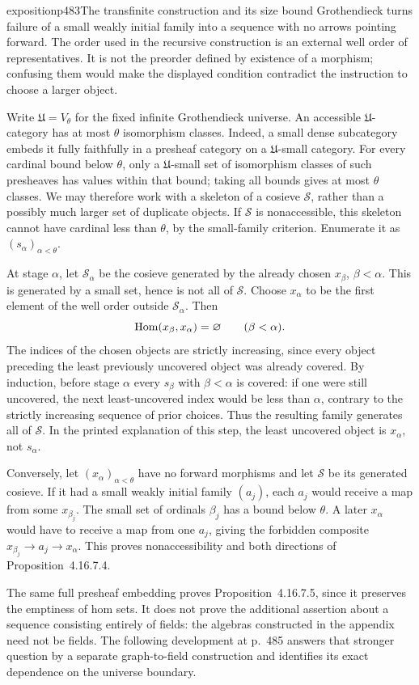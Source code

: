\begin{dcomment}{exposition}{p483}{The transfinite construction and its size bound}
Grothendieck turns failure of a small weakly initial family into a sequence with no arrows pointing forward. The order used in the recursive construction is an external well order of representatives. It is not the preorder defined by existence of a morphism; confusing them would make the displayed condition contradict the instruction to choose a larger object.

Write $\mathfrak U=V_\theta$ for the fixed infinite Grothendieck universe. An accessible $\mathfrak U$-category has at most $\theta$ isomorphism classes. Indeed, a small dense subcategory embeds it fully faithfully in a presheaf category on a $\mathfrak U$-small category. For every cardinal bound below $\theta$, only a $\mathfrak U$-small set of isomorphism classes of such presheaves has values within that bound; taking all bounds gives at most $\theta$ classes. We may therefore work with a skeleton of a cosieve $\mathcal S$, rather than a possibly much larger set of duplicate objects. If $\mathcal S$ is nonaccessible, this skeleton cannot have cardinal less than $\theta$, by the small-family criterion. Enumerate it as $(s_\alpha)_{\alpha<\theta}$.

At stage $\alpha$, let $\mathcal S_\alpha$ be the cosieve generated by the already chosen $x_\beta$, $\beta<\alpha$. This is generated by a small set, hence is not all of $\mathcal S$. Choose $x_\alpha$ to be the first element of the well order outside $\mathcal S_\alpha$. Then
\[
 \operatorname{Hom}(x_\beta,x_\alpha)=\varnothing\qquad(\beta<\alpha).
\]
The indices of the chosen objects are strictly increasing, since every object preceding the least previously uncovered object was already covered. By induction, before stage $\alpha$ every $s_\beta$ with $\beta<\alpha$ is covered: if one were still uncovered, the next least-uncovered index would be less than $\alpha$, contrary to the strictly increasing sequence of prior choices. Thus the resulting family generates all of $\mathcal S$. In the printed explanation of this step, the least uncovered object is $x_\alpha$, not $s_\alpha$.

Conversely, let $(x_\alpha)_{\alpha<\theta}$ have no forward morphisms and let $\mathcal S$ be its generated cosieve. If it had a small weakly initial family $(a_j)$, each $a_j$ would receive a map from some $x_{\beta_j}$. The small set of ordinals $\beta_j$ has a bound below $\theta$. A later $x_\alpha$ would have to receive a map from one $a_j$, giving the forbidden composite $x_{\beta_j}\to a_j\to x_\alpha$. This proves nonaccessibility and both directions of Proposition~4.16.7.4.

The same full presheaf embedding proves Proposition~4.16.7.5, since it preserves the emptiness of hom sets. It does not prove the additional assertion about a sequence consisting entirely of fields: the algebras constructed in the appendix need not be fields. The following development at p.~485 answers that stronger question by a separate graph-to-field construction and identifies its exact dependence on the universe boundary.
\end{dcomment}



